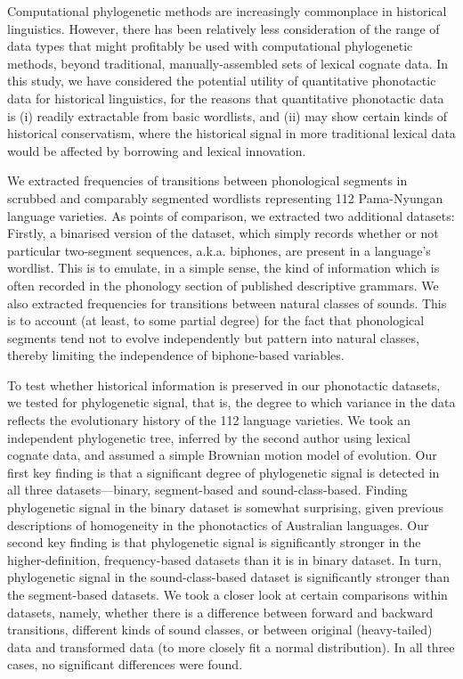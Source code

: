 Computational phylogenetic methods are increasingly commonplace in historical linguistics. However, there has been relatively less consideration of the range of data types that might profitably be used with computational phylogenetic methods, beyond traditional, manually-assembled sets of lexical cognate data. In this study, we have considered the potential utility of quantitative phonotactic data for historical linguistics, for the reasons that quantitative phonotactic data is (i) readily extractable from basic wordlists, and (ii) may show certain kinds of historical conservatism, where the historical signal in more traditional lexical data would be affected by borrowing and lexical innovation.

We extracted frequencies of transitions between phonological segments in scrubbed and comparably segmented wordlists representing 112 Pama-Nyungan language varieties. As points of comparison, we extracted two additional datasets: Firstly, a binarised version of the dataset, which simply records whether or not particular two-segment sequences, a.k.a. biphones, are present in a language's wordlist. This is to emulate, in a simple sense, the kind of information which is often recorded in the phonology section of published descriptive grammars. We also extracted frequencies for transitions between natural classes of sounds. This is to account (at least, to some partial degree) for the fact that phonological segments tend not to evolve independently but pattern into natural classes, thereby limiting the independence of biphone-based variables.

To test whether historical information is preserved in our phonotactic datasets, we tested for phylogenetic signal, that is, the degree to which variance in the data reflects the evolutionary history of the 112 language varieties. We took an independent phylogenetic tree, inferred by the second author using lexical cognate data, and assumed a simple Brownian motion model of evolution. Our first key finding is that a significant degree of phylogenetic signal is detected in all three datasets---binary, segment-based and sound-class-based. Finding phylogenetic signal in the binary dataset is somewhat surprising, given previous descriptions of homogeneity in the phonotactics of Australian languages. Our second key finding is that phylogenetic signal is significantly stronger in the higher-definition, frequency-based datasets than it is in binary dataset. In turn, phylogenetic signal in the sound-class-based dataset is significantly stronger than the segment-based datasets. We took a closer look at certain comparisons within datasets, namely, whether there is a difference between forward and backward transitions, different kinds of sound classes, or between original (heavy-tailed) data and transformed data (to more closely fit a normal distribution). In all three cases, no significant differences were found.

